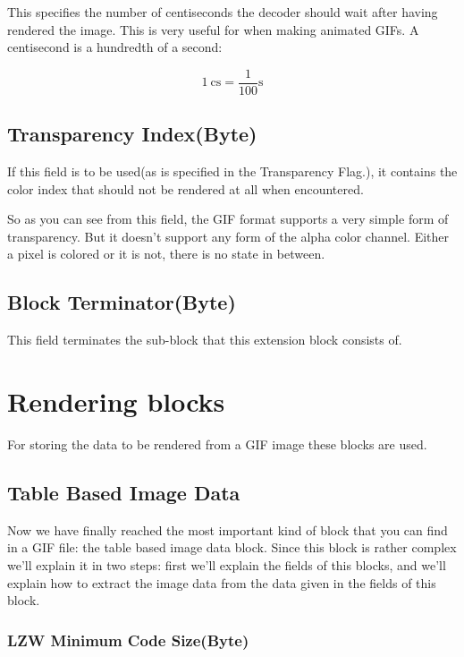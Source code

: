   This specifies the number of centiseconds the decoder should wait after
  having rendered the image. This is very useful for when making
  animated GIFs. A centisecond is a hundredth of a
  second:

  \begin{equation*}
    \SI{1}{\centi\second} = \frac{1}{100}\si{\second}
  \end{equation*}

  \subsection{Transparency Index(Byte)}

  If this field is to be used(as is specified in the Transparency
  Flag.), it contains the color index that should not be rendered at
  all when encountered.

  So as you can see from this field, the GIF format supports a very
  simple form of transparency. But it doesn't support any form of the
  alpha color channel. Either a pixel is colored or it is not, there is
  no state in between.

  \subsection{Block Terminator(Byte)}

  This field terminates the sub-block that this extension block
  consists of.

  \section{Rendering blocks}

  For storing the data to be rendered from a GIF image these blocks
  are used.

  \subsection{Table Based Image Data}

  Now we have finally reached the most important kind of block that
  you can find in a GIF file: the table based image data block. Since this
  block is rather complex we'll explain it in two steps: first we'll
  explain the fields of this blocks, and we'll explain how to extract
  the image data from the data given in the fields of this block.

  \subsubsection{LZW Minimum Code Size(Byte)}

